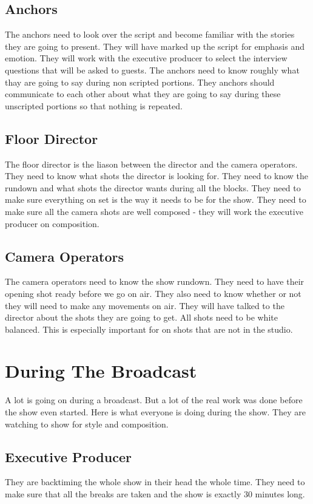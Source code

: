 \documentclass[letterpaper,10pt,oneside]{article}
\begin{document}
\subsection{Anchors}
The anchors need to look over the script and become familiar with the stories they are going to present. They will have marked up the script for emphasis and emotion. They will work with the executive producer to select the interview questions that will be asked to guests. The anchors need to know roughly what thay are going to say during non scripted portions. They anchors should communicate to each other about what they are going to say during these unscripted portions so that nothing is repeated.

\subsection{Floor Director}
The floor director is the liason between the director and the camera operators. They need to know what shots the director is looking for. They need to know the rundown and what shots the director wants during all the blocks. They need to make sure everything on set is the way it needs to be for the show. They need to make sure all the camera shots are well composed - they will work the executive producer on composition.

\subsection{Camera Operators}
The camera operators need to know the show rundown. They need to have their opening shot ready before we go on air. They also need to know whether or not they will need to make any movements on air. They will have talked to the director about the shots they are going to get. All shots need to be white balanced. This is especially important for on shots that are not in the studio.


\vspace{25 mm}

\section{During The Broadcast}
A lot is going on during a broadcast. But a lot of the real work was done before the show even started. Here is what everyone is doing during the show. They are watching to show for style and composition.
\subsection{Executive Producer}
They are backtiming the whole show in their head the whole time. They need to make sure that all the breaks are taken and the show is exactly 30 minutes long.
\end{document}
